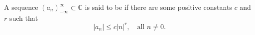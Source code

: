 \begin{definition}
A sequence $(a_n)_{-\infty}^{\infty} \subset \mathbb{C}$ is said to be  if there are some positive constants $c$ and $r$ such that
$$|a_n| \leq c|n|^r, \quad \text{all } n \neq 0.$$
\end{definition}
